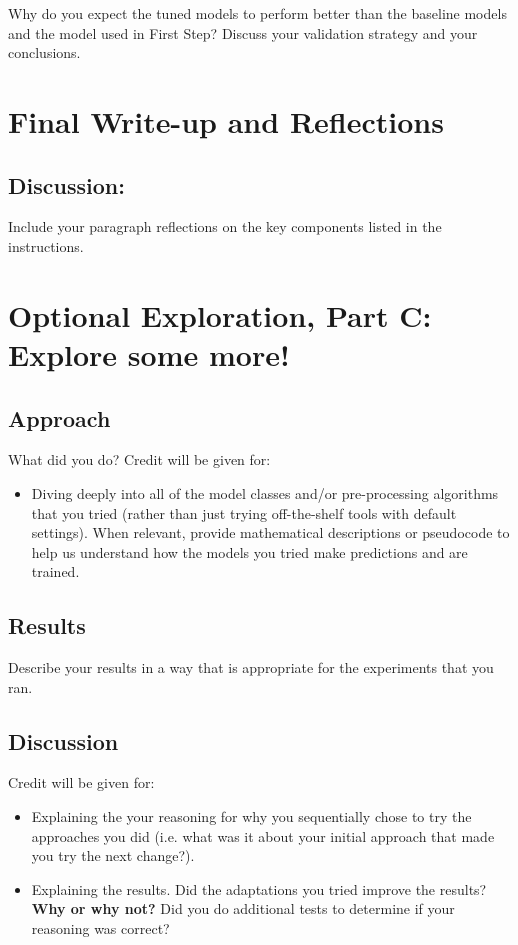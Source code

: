 \documentclass[11pt]{article}
\begin{document}
Why do you expect the tuned models to perform better than the baseline models and the model used in First Step? Discuss your validation strategy and your conclusions.

\section{Final Write-up and Reflections}

\subsection{Discussion:} 

Include your paragraph reflections on the key components listed in the instructions.


\section{Optional Exploration, Part C: Explore some more!}
\subsection{Approach}

What did you do? Credit will be given for:
  \begin{itemize}
  \item Diving deeply into all of the model classes and/or pre-processing algorithms that you tried (rather than just trying off-the-shelf tools with default settings).  When relevant, provide mathematical descriptions or pseudocode to help us understand how the models you tried make predictions and are trained. 
  \end{itemize}
  

\subsection{Results}

Describe your results in a way that is appropriate for the experiments that you ran.

\subsection{Discussion}
Credit will be given for:

  \begin{itemize}
  \item Explaining the your reasoning for why you sequentially chose to
    try the approaches you did (i.e. what was it about your initial
    approach that made you try the next change?).  
  \item Explaining the results.  Did the adaptations you tried improve
    the results?  \textbf{Why or why not?}  Did you do additional tests to
    determine if your reasoning was correct?  
  \end{itemize}
 
\end{document}
